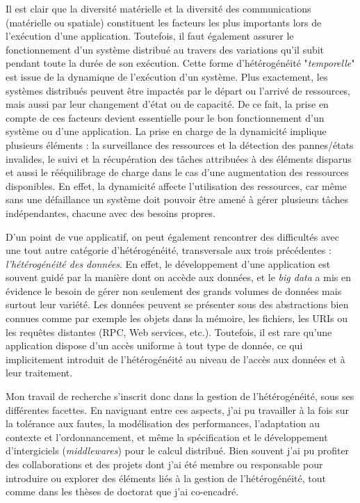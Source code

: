Il est clair que la diversité matérielle et la diversité des communications (matérielle ou spatiale) constituent les facteurs les plus importants lors de l'exécution d'une application. Toutefois, il faut également assurer le fonctionnement d'un système distribué au travers des variations qu'il subit pendant toute la durée de son exécution. Cette forme d'hétérogénéité "\textit{temporelle}" est issue de la dynamique de l'exécution d'un système. Plus exactement, les systèmes distribués peuvent être impactés par le départ ou l'arrivé de ressources, mais aussi par leur changement d'état ou de capacité. De ce fait, la prise en compte de ces facteurs devient essentielle pour le bon fonctionnement d'un système ou d'une application. La prise en charge de la dynamicité implique plusieurs éléments : la surveillance des ressources et la détection des pannes/états invalides, le suivi et la récupération des tâches attribuées à des éléments disparus et aussi le rééquilibrage de charge dans le cas d'une augmentation des ressources disponibles. En effet, la dynamicité affecte l'utilisation des ressources, car même sans une défaillance un système doit pouvoir être amené à gérer plusieurs tâches indépendantes, chacune avec des besoins propres.

D'un point de vue applicatif, on peut également rencontrer des difficultés avec une tout autre catégorie d'hétérogénéité, transversale aux trois précédentes : \textit{l'hétérogénéité des données}. En effet, le développement d'une application est souvent guidé par la manière dont on accède aux données, et le \textit{big data} a mis en évidence le besoin de gérer non seulement des grands volumes de données mais surtout leur variété. Les données peuvent se présenter sous des abstractions bien connues comme par exemple les objets dans la mémoire, les fichiers, les URIs ou les requêtes distantes (RPC, Web services, etc.). Toutefois, il est rare qu'une application dispose d'un accès uniforme à tout type de donnée, ce qui implicitement introduit de l'hétérogénéité au niveau de l'accès aux données et à leur traitement. 

Mon travail de recherche s'inscrit donc dans la gestion de l'hétérogénéité, sous ses différentes facettes. En naviguant entre ces aspects, j'ai pu travailler à la fois sur la tolérance aux fautes, la modélisation des performances, l'adaptation au contexte et l'ordonnancement, et même la spécification et le développement d'intergiciels (\textit{middlewares}) pour le calcul distribué. Bien souvent j'ai pu profiter des collaborations et des projets dont j'ai été membre ou responsable pour introduire ou explorer des éléments liés à la gestion de l'hétérogénéité, tout comme dans les thèses de doctorat que j'ai co-encadré. 

